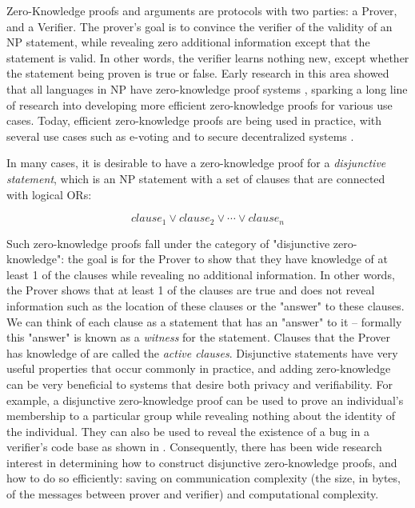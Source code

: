 Zero-Knowledge proofs and arguments \cite{GMR85} are protocols with two parties: a Prover, and a Verifier. 
The prover's goal is to convince the verifier of the validity of an NP statement, while revealing zero additional 
information except that the statement is valid. In other words, the verifier learns nothing new, except whether 
the statement being proven is true or false. Early research in this area showed that all languages in NP have 
zero-knowledge proof systems \cite{DBLP:conf/focs/GoldreichMW86}, sparking a long line of research into developing 
more efficient zero-knowledge proofs for various use cases. Today, efficient zero-knowledge proofs are being used 
in practice, with several use cases such as e-voting and to secure decentralized systems \cite{evoting, zcash}.

In many cases, it is desirable to have a zero-knowledge proof for a \textit{disjunctive statement}, which is an NP 
statement with a set of clauses that are connected with logical ORs:

$$
clause_1 \lor clause_2 \lor \cdots \lor clause_n
$$

Such zero-knowledge proofs fall under the category of "disjunctive zero-knowledge": the goal is for the Prover 
to show that they have knowledge of at least 1 of the clauses while revealing no additional information. 
In other words, the Prover shows that at least 1 of the clauses are true and does not reveal 
information such as the location of these clauses or the "answer" to these clauses. 
We can think of each clause as a statement that has an "answer" to it -- formally this "answer" 
is known as a \textit{witness} for the statement. Clauses that the Prover has 
knowledge of are called the \textit{active clauses}. 
Disjunctive statements have very useful properties that occur commonly in practice, and adding zero-knowledge can be very beneficial to  
systems that desire both privacy and verifiability. For example, a disjunctive zero-knowledge proof can be used to prove an 
individual's membership to a particular group while revealing nothing about the identity of the individual. They can also be 
used to reveal the existence of a bug in a verifier's code base as shown in \cite{StackedGF}. Consequently, there has been 
wide research interest in determining how to construct disjunctive zero-knowledge proofs, and how to do so efficiently: saving 
on communication complexity (the size, in bytes, of the messages between prover and verifier) and computational complexity.  

